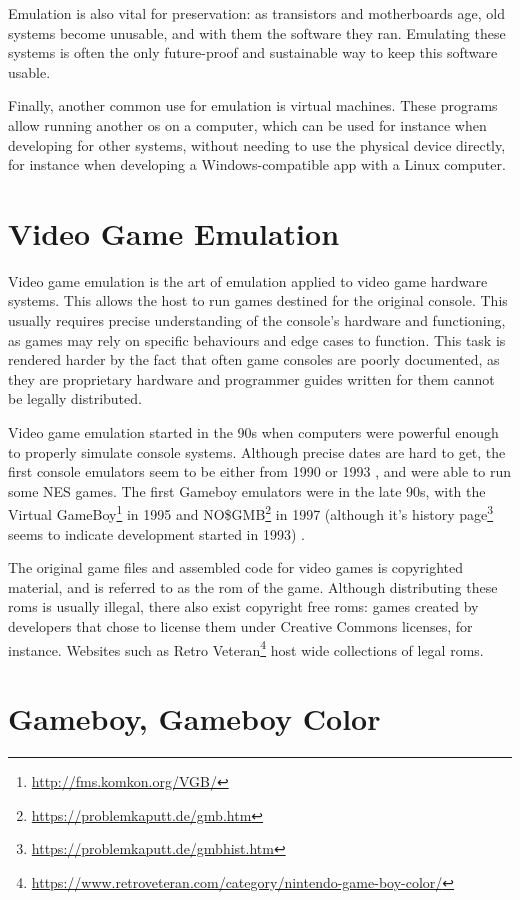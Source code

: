 \documentclass[11pt]{report}
\newcommand{\ftnt}[1]{\footnote{\url{#1}}}
\begin{document}
Emulation is also vital for preservation: as transistors and motherboards age, old systems become unusable, and with them the software they ran. Emulating these systems is often the only future-proof and sustainable way to keep this software usable.

Finally, another common use for emulation is virtual machines. These programs allow running another \gls{os} on a computer, which can be used for instance when developing for other systems, without needing to use the physical device directly, for instance when developing a Windows-compatible app with a Linux computer.

\section{Video Game Emulation}

Video game emulation is the art of emulation applied to video game hardware systems. This allows the host to run games destined for the original console. This usually requires precise understanding of the console's hardware and functioning, as games may rely on specific behaviours and edge cases to function. This task is rendered harder by the fact that often game consoles are poorly documented, as they are proprietary hardware and programmer guides written for them cannot be legally distributed.

Video game emulation started in the 90s when computers were powerful enough to properly simulate console systems. Although precise dates are hard to get, the first console emulators seem to be either from 1990 or 1993 \cite{first_nes_emu}, and were able to run some NES games. The first Gameboy emulators were in the late 90s, with the Virtual GameBoy\ftnt{http://fms.komkon.org/VGB/} in 1995 and NO\$GMB\ftnt{https://problemkaputt.de/gmb.htm} in 1997 (although it's history page\ftnt{https://problemkaputt.de/gmbhist.htm} seems to indicate development started in 1993) \cite{first_gb_emus}.

The original game files and assembled code for video games is copyrighted material, and is referred to as the \gls{rom} of the game. Although distributing these \glspl{rom} is usually illegal, there also exist copyright free \glspl{rom}: games created by developers that chose to license them under Creative Commons licenses, for instance. Websites such as Retro Veteran\ftnt{https://www.retroveteran.com/category/nintendo-game-boy-color/} host wide collections of legal \glspl{rom}.

\section{Gameboy, Gameboy Color}
\end{document}
